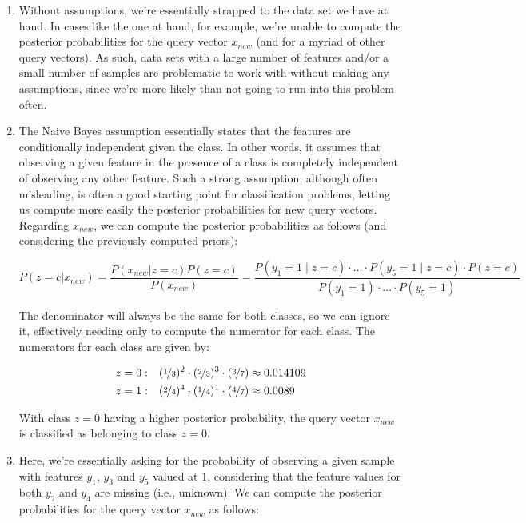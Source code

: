 \documentclass[12pt]{article}
\begin{document}
\begin{enumerate}[leftmargin=\labelsep]
\begin{enumerate}
{                }
          \item {
                Without assumptions, we're essentially strapped to the data set we have at hand.
                In cases like the one at hand, for example, we're unable to compute the posterior
                probabilities for the query vector $x_{new}$ (and for a myriad of other query vectors).
                As such, data sets with a large number of features and/or a small number of samples
                are problematic to work with without making any assumptions, since we're
                more likely than not going to run into this problem often.
                }
          \item {
                The Naive Bayes assumption essentially states that the features are conditionally
                independent given the class. In other words, it assumes that observing a given
                feature in the presence of a class is completely independent of observing any other feature.
                Such a strong assumption, although often misleading, is often a good starting point for
                classification problems, letting us compute more easily the posterior probabilities
                for new query vectors. Regarding $x_{new}$, we can compute the posterior probabilities
                as follows (and considering the previously computed priors):

                $$
                  P(z = c | x_{new}) = \frac{P(x_{new} | z = c) P(z = c)}{P(x_{new})}
                  = \frac{P(y_1 = 1 \mid z = c) \cdot ... \cdot P(y_5 = 1 \mid z = c) \cdot P(z = c)}{P(y_1 = 1) \cdot ... \cdot P(y_5 = 1)}
                $$

                The denominator will always be the same for both classes, so we can ignore it,
                effectively needing only to compute the numerator for each class. The numerators
                for each class are given by:

                \begin{align*}
                  z = 0: & \quad (\nicefrac{1}{3})^2 \cdot (\nicefrac{2}{3})^3 \cdot (\nicefrac{3}{7})\approx 0.014109 \\
                  z = 1: & \quad (\nicefrac{2}{4})^4 \cdot (\nicefrac{1}{4})^1 \cdot (\nicefrac{4}{7})\approx 0.0089
                \end{align*}

                With class $z=0$ having a higher posterior probability, the query vector $x_{new}$
                is classified as belonging to class $z=0$.
                }
          \item {
                Here, we're essentially asking for the probability of observing a given sample
                with features $y_1$, $y_3$ and $y_5$ valued at $1$, considering that the
                feature values for both $y_2$ and $y_4$ are missing (i.e., unknown). We can
                compute the posterior probabilities for the query vector $x_{new}$ as follows:

}
\end{enumerate}
\end{enumerate}
\end{document}
